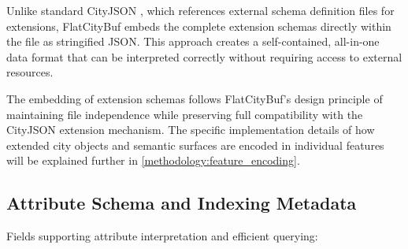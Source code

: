 Unlike standard CityJSON \citep{cityjson_spec}, which references external schema definition files for extensions, FlatCityBuf embeds the complete extension schemas directly within the file as stringified JSON. This approach creates a self-contained, all-in-one data format that can be interpreted correctly without requiring access to external resources.

The embedding of extension schemas follows FlatCityBuf's design principle of maintaining file independence while preserving full compatibility with the CityJSON extension mechanism. The specific implementation details of how extended city objects and semantic surfaces are encoded in individual features will be explained further in \autoref{methodology:feature_encoding}.

\subsection{Attribute Schema and Indexing Metadata}
\label{methodology:header:schema_indexing}

Fields supporting attribute interpretation and efficient querying:

